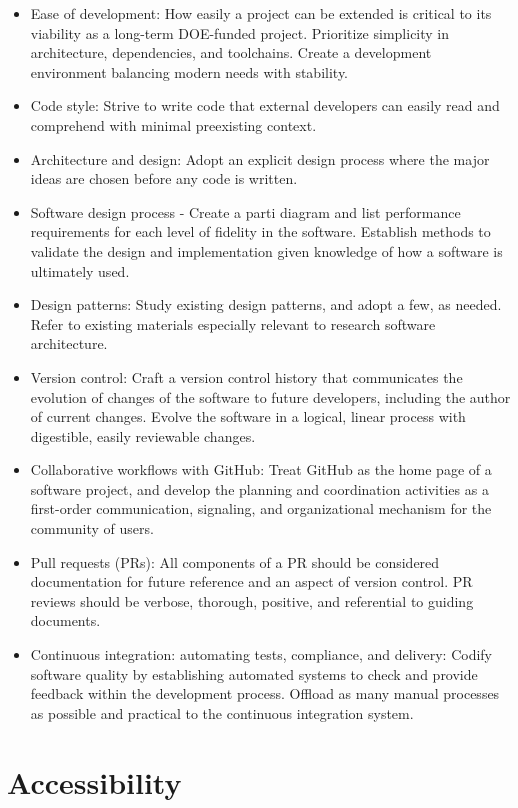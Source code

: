 \documentclass[]{nrel}
\begin{document}
\begin{itemize}
\item Ease of development: How easily a project can be extended is critical to its viability as a long-term
DOE-funded project.
Prioritize simplicity in architecture, dependencies, and toolchains.
Create a development environment balancing modern needs with stability.
\item Code style: Strive to write code that external developers can easily read and comprehend with minimal
preexisting context.
\item Architecture and design: Adopt an explicit design process where the major ideas are chosen before any code is written.
\item Software design process - Create a parti diagram and list performance requirements for each level of fidelity in the software.
Establish methods to validate the design and implementation given knowledge of how a software
is ultimately used.
\item Design patterns: Study existing design patterns, and adopt a few, as needed.
Refer to existing materials especially relevant to research software architecture.
\item Version control: Craft a version control history that communicates the evolution of changes of the software
to future developers, including the author of current changes.
Evolve the software in a logical, linear process with digestible, easily reviewable changes.
\item Collaborative workflows with GitHub: Treat GitHub as the home page of a software project, and develop the planning and coordination
activities as a first-order communication, signaling, and organizational mechanism for the
community of users.
\item Pull requests (PRs): All components of a PR should be considered documentation for future reference
and an aspect of version control.
PR reviews should be verbose, thorough, positive, and referential to guiding documents.
\item Continuous integration: automating tests, compliance, and delivery: Codify software quality by establishing automated systems to check and provide feedback
within the development process.
Offload as many manual processes as possible and practical to the continuous integration system.
\end{itemize}


\chapter{Accessibility}
\label{sec:accessibility}
\end{document}
